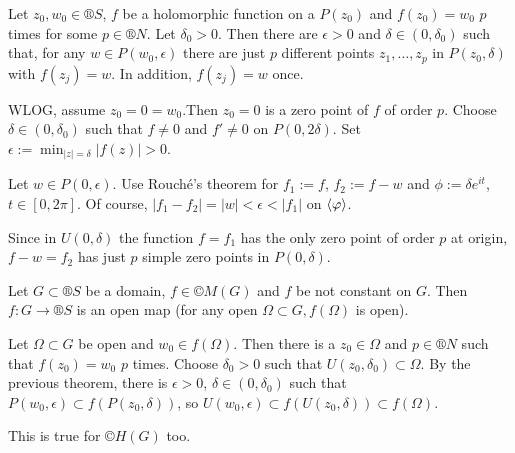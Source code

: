 \documentclass[12pt]{article}					%
\begin{document}
\begin{veta}
	Let $z_0, w_0 \in ®S$, $f$ be a holomorphic function on a $P(z_0)$ and $f(z_0) = w_0$ $p$ times for some $p \in ®N$. Let $\delta_0 > 0$. Then there are $\epsilon > 0$ and $\delta \in (0, \delta_0)$ such that, for any $w \in P(w_0, \epsilon)$ there are just $p$ different points $z_1, …, z_p$ in $P(z_0, \delta)$ with $f(z_j) = w$. In addition, $f(z_j) = w$ once.

	\begin{dukazin}
		WLOG, assume $z_0 = 0 = w_0$.Then $z_0 = 0$ is a zero point of $f$ of order $p$. Choose $\delta \in (0, \delta_0)$ such that $f ≠ 0$ and $f' ≠ 0$ on $P(0, 2\delta)$. Set $\epsilon := \min_{|z| = \delta} |f(z)| > 0$.

		Let $w \in P(0, \epsilon)$. Use Rouché's theorem for $f_1 := f$, $f_2 := f - w$ and $\phi := \delta e^{it}$, $t \in [0, 2\pi]$. Of course, $|f_1 - f_2| = |w| < \epsilon < |f_1|$ on $\left\langle\varphi\right\rangle$.

		Since in $U(0, \delta)$ the function $f = f_1$ has the only zero point of order $p$ at origin, $f - w = f_2$ has just $p$ simple zero points in $P(0, \delta)$.
	\end{dukazin}
\end{veta}

\begin{dusledek}
	Let $G \subset ®S$ be a domain, $f \in ©M(G)$ and $f$ be not constant on $G$. Then $f: G \rightarrow ®S$ is an open map (for any open $\Omega \subset G, f(\Omega)$ is open).

	\begin{dukazin}
		Let $\Omega \subset G$ be open and $w_0 \in f(\Omega)$. Then there is a $z_0 \in \Omega$ and $p \in ®N$ such that $f(z_0) = w_0$ $p$ times. Choose $\delta_0 > 0$ such that $U(z_0, \delta_0) \subset \Omega$. By the previous theorem, there is $\epsilon > 0$, $\delta \in (0, \delta_0)$ such that $P(w_0, \epsilon) \subset f(P(z_0, \delta))$, so $U(w_0, \epsilon) \subset f(U(z_0, \delta)) \subset f(\Omega)$.
	\end{dukazin}

	\begin{poznamkain}
		This is true for $©H(G)$ too.
	\end{poznamkain}
\end{dusledek}
\end{document}
